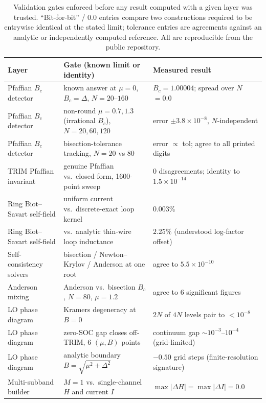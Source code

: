 \documentclass[aps,physrev,reprint,superscriptaddress,amsmath,amssymb,floatfix]{revtex4-2}
\begin{document}
\begingroup
\squeezetable
\begin{table}[t]
\caption{Validation gates enforced before any result computed with a given
layer was trusted. ``Bit-for-bit'' / $0.0$ entries compare two
constructions required to be entrywise identical at the stated limit;
tolerance entries are agreements against an analytic or independently
computed reference. All are reproducible from the public repository.}
\label{tab:gates}
\begin{ruledtabular}
\begin{tabular}{lll}
Layer & Gate (known limit or identity) & Measured result \\
\hline
Pfaffian $B_c$ detector      & known answer at $\mu=0$, $B_c=\Delta$, $N=20$--$160$      & $B_c=1.00004$; spread over $N$ $=0.0$ \\
Pfaffian $B_c$ detector      & non-round $\mu=0.7,1.3$ (irrational $B_c$), $N=20,60,120$ & error $\pm3.8\times10^{-8}$, $N$-independent \\
Pfaffian $B_c$ detector      & bisection-tolerance tracking, $N=20$ vs $80$              & error $\propto$ tol; agree to all printed digits \\
TRIM Pfaffian invariant      & genuine Pfaffian vs.\ closed form, 1600-point sweep       & 0 disagreements; identity to $1.5\times10^{-14}$ \\
Ring Biot--Savart self-field & uniform current vs.\ discrete-exact loop kernel           & $0.003\%$ \\
Ring Biot--Savart self-field & vs.\ analytic thin-wire loop inductance                   & $2.25\%$ (understood log-factor offset) \\
Self-consistency solvers     & bisection / Newton--Krylov / Anderson at one root         & agree to $5.5\times10^{-10}$ \\
Anderson mixing              & Anderson vs.\ bisection $B_c$, $N=80$, $\mu=1.2$          & agree to 6 significant figures \\
LO phase diagram             & Kramers degeneracy at $B=0$                                & $2N$ of $4N$ levels pair to $<10^{-8}$ \\
LO phase diagram             & zero-SOC gap closes off-TRIM, 6 $(\mu,B)$ points          & continuum gap $\sim10^{-3}$--$10^{-4}$ (grid-limited) \\
LO phase diagram             & analytic boundary $B=\sqrt{\mu^2+\Delta^2}$               & $-0.50$ grid steps (finite-resolution signature) \\
Multi-subband builder        & $M=1$ vs.\ single-channel $H$ and current $I$             & $\max|\Delta H|=\max|\Delta I|=0.0$ \\

\end{tabular}
\end{ruledtabular}
\end{table}
\end{document}

